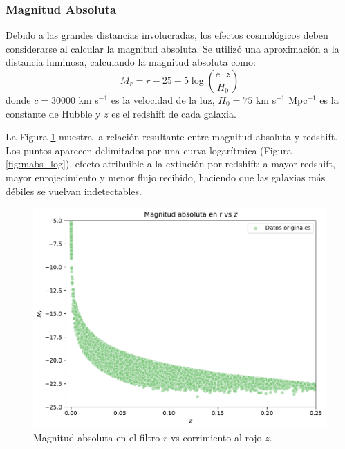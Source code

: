 \documentclass[twocolumn]{article}
\begin{document}
\subsubsection{Magnitud Absoluta}

Debido a las grandes distancias involucradas, los efectos cosmológicos deben considerarse al calcular la magnitud absoluta. Se utilizó una aproximación a la distancia luminosa, calculando la magnitud absoluta como:
\begin{equation}
M_r= r - 25 - 5 \log\left(\frac{c \cdot z}{H_0}\right)
\end{equation}
donde $c = 30000$ km s$^{-1}$ es la velocidad de la luz, $H_0 = 75$ km s$^{-1}$ Mpc$^{-1}$ es la constante de Hubble y $z$ es el redshift de cada galaxia.

La Figura \ref{fig:mabs} muestra la relación resultante entre magnitud absoluta y redshift. Los puntos aparecen delimitados por una curva logarítmica (Figura \ref{fig:mabs_log}), efecto atribuible a la extinción por redshift: a mayor redshift, mayor enrojecimiento y menor flujo recibido, haciendo que las galaxias más débiles se vuelvan indetectables.

\begin{figure}[t]
\includegraphics[width=\linewidth]{mabs.pdf}
\caption{Magnitud absoluta en el filtro $r$ vs corrimiento al rojo $z$.}
\label{fig:mabs}
\end{figure}
\end{document}
